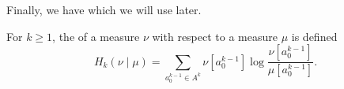 Finally, we have  which we will use later.

\begin{definition}
	For $k \geq 1$, the  of a measure $\nu$ with respect to a measure $\mu$ is defined
	\[
		H_k(\nu \mid \mu) = \sum_{a_0^{k - 1} \in A^k}{\nu[a_0^{k - 1}] \log{\frac{\nu[a_0^{k - 1}]}{\mu[a_0^{k - 1}]}}}.
	\]
\end{definition}
